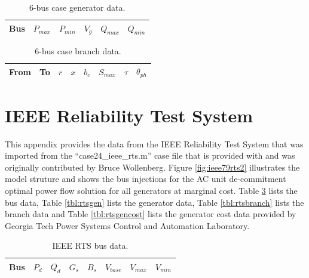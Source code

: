 \begin{table}[h]
\begin{center}
\begin{tabular}{c|c|c|c|c|c}
\hline
Bus &$P_{max}$ &$P_{min}$ &$V_g$ &$Q_{max}$ &$Q_{min}$\\
\hline\hline

\hline
\end{tabular}
\caption{6-bus case generator data.}
\label{tbl:case6ww_gen}
\end{center}
\end{table}

\begin{table}[h]
\begin{center}
\begin{tabular}{c|c|c|c|c|c|c|c}
\hline
From &To &$r$ &$x$ &$b_c$ &$S_{max}$ &$\tau$ &$\theta_{ph}$\\
\hline\hline

\hline
\end{tabular}
\caption{6-bus case branch data.}
\label{tbl:case6ww_branch}
\end{center}
\end{table}

\section{IEEE Reliability Test System}
\label{adx:ieee_rts}
This appendix provides the data from the IEEE Reliability Test System
\cite{ieee79rts} that was imported from the ``case24\_ieee\_rts.m'' case file
that is provided with \matpower and was originally contributed by Bruce
Wollenberg.  Figure \ref{fig:ieee79rts2} illustrates the model struture and
shows the bus injections for the AC unit de-commitment optimal power flow
solution for all generators at marginal cost.  Table \ref{tbl:rtsbus} lists the
bus data, Table \ref{tbl:rtsgen} lists the generator data, Table
\ref{tbl:rtsbranch} lists the branch data and Table \ref{tbl:rtsgencost} lists
the generator cost data provided by Georgia Tech Power Systems Control and
Automation Laboratory.

%


\begin{table}[h]
\begin{center}
\begin{tabular}{c|c|c|c|c|c|c|c}
\hline
Bus &$P_d$ &$Q_d$ &$G_s$ &$B_s$ &$V_{base}$ &$V_{max}$ &$V_{min}$\\
\hline\hline

\hline
\end{tabular}
\caption{IEEE RTS bus data.}
\label{tbl:rtsbus}
\end{center}
\end{table}

